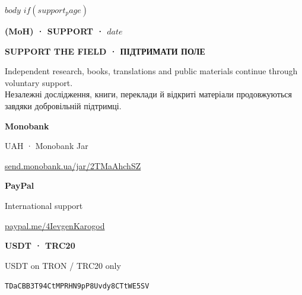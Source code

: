 \documentclass[10pt,a4paper]{article}
\begin{document}
\justifying
$body$
$if(support_page)$
\clearpage
\thispagestyle{fancy}
{\fontsize{8}{10}\selectfont\bfseries\color{MoHMuted}(MoH) · SUPPORT · $date$\par}
\vspace{5mm}
{\fontsize{26}{29}\selectfont\bfseries\color{MoHInk}SUPPORT THE FIELD · ПІДТРИМАТИ ПОЛЕ\par}
\vspace{4mm}
{\fontsize{11}{15}\selectfont\color{MoHMuted}Independent research, books, translations and public materials continue through voluntary support.\\Незалежні дослідження, книги, переклади й відкриті матеріали продовжуються завдяки добровільній підтримці.\par}
\vspace{9mm}
\noindent
\begin{minipage}[t]{0.30\linewidth}\centering
{\bfseries Monobank}\par\vspace{4mm}
\color{black}\par\vspace{4mm}
{\fontsize{7.6}{10}\selectfont UAH · Monobank Jar\par}
{\fontsize{7.6}{10}\selectfont\href{https://send.monobank.ua/jar/2TMaAhchSZ}{send.monobank.ua/jar/2TMaAhchSZ}\par}
\end{minipage}\hfill
\begin{minipage}[t]{0.30\linewidth}\centering
{\bfseries PayPal}\par\vspace{4mm}
\color{black}\par\vspace{4mm}
{\fontsize{7.6}{10}\selectfont International support\par}
{\fontsize{7.6}{10}\selectfont\href{https://www.paypal.me/4IevgenKarogod}{paypal.me/4IevgenKarogod}\par}
\end{minipage}\hfill
\begin{minipage}[t]{0.30\linewidth}\centering
{\bfseries USDT · TRC20}\par\vspace{4mm}
\color{black}\par\vspace{4mm}
{\fontsize{7.6}{10}\selectfont USDT on TRON / TRC20 only\par}
{\fontsize{7.1}{9}\selectfont\texttt{TDaCBB3T94CtMPRHN9pP8Uvdy8CTtWE5SV}\par}
\end{minipage}
\end{document}
